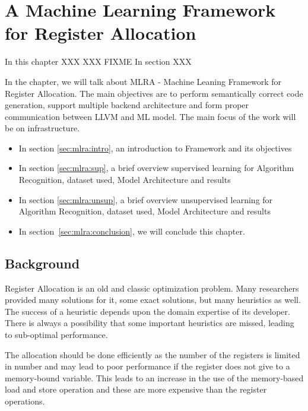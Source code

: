 \chapter{A Machine Learning Framework for Register Allocation}
\label{chap:ch5}

In this chapter XXX XXX FIXME In section XXX


In the chapter, we will talk about MLRA - Machine Leaning Framework for Register Allocation. The main objectives are to perform semantically correct code generation, support multiple backend architecture and form proper communication between LLVM and ML model. The main focus of the work will be on infrastructure.

\begin{itemize}
    
    \item In section \ref{sec:mlra:intro}, an introduction to Framework and its objectives
    
    \item In section \ref{sec:mlra:sup}, a brief overview supervised learning for Algorithm Recognition, dataset used, Model Architecture and results
    
    \item In section \ref{sec:mlra:unsup}, a brief overview unsupervised learning for Algorithm Recognition, dataset used, Model Architecture and results  
    
    \item  In section~\ref{sec:mlra:conclusion}, we will conclude this chapter.

\end{itemize}


\section{Background}\label{sec:mlra:bg}
Register Allocation is an old and classic optimization problem. Many researchers provided many solutions for it, some exact solutions, but many heuristics as well. The success of a heuristic  depends upon the domain expertise of its developer. There is always a possibility that some important heuristics are missed, leading to sub-optimal performance.

The allocation should be done efficiently as the number of the registers is limited in number and may lead to poor performance if the register does not give to a memory-bound variable. This leads to an increase in the use of the memory-based load and store operation and these are more expensive than the register operations. 


